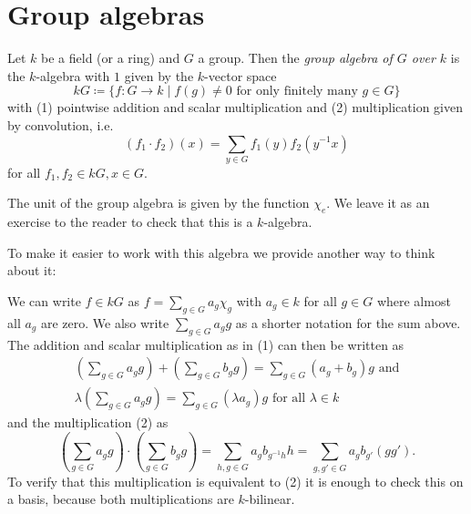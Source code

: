 \section{Group algebras}


\begin{defi}
  Let $k$ be a field (or a ring) and $G$ a group.
  Then the \emph{group algebra of $G$ over $k$} is the $k$-algebra with $1$ given by the $k$-vector space
  \[
              kG
    \coloneqq \{
                f \colon G \to k
              \mid
                f(g) \neq 0 \text{ for only finitely many } g \in G
              \}
  \]
  with (1) pointwise addition and scalar multiplication and (2) multiplication given by convolution, i.e.\
  \[
      (f_1 \cdot f_2)(x)
    = \sum_{y \in G} f_1(y) f_2\left( y^{-1}x \right)
  \]
  for all $f_1, f_2 \in kG, x \in G$.
\end{defi}

The unit of the group algebra is given by the function $\chi_e$.
We leave it as an exercise to the reader to check that this is a $k$-algebra.

To make it easier to work with this algebra we provide another way to think about it:

We can write $f \in kG$ as $f = \sum_{g \in G} a_g \chi_g$ with $a_g \in k$ for all $g \in G$ where almost all $a_g$ are zero.
We also write $\sum_{g \in G} a_g g$ as a shorter notation for the sum above.
The addition and scalar multiplication as in (1) can then be written as
\begin{gather*}
      \left( \sum_{g \in G} a_g g \right)
    + \left( \sum_{g \in G} b_g g \right)
  = \sum_{g \in G} (a_g + b_g) g
  \text{ and}
  \\
    \lambda \left( \sum_{g \in G} a_g g \right)
  = \sum_{g \in G} (\lambda a_g) g
    \text{ for all }
    \lambda \in k
\end{gather*}
and the multiplication (2) as
\[
          \left( \sum_{g \in G} a_g g \right)
    \cdot \left( \sum_{g \in G} b_g g \right)
  = \sum_{h, g \in G} a_g b_{g^{-1}h} h
  = \sum_{g, g' \in G} a_g b_{g'} (g g').
\]
To verify that this multiplication is equivalent to (2) it is enough to check this on a basis, because both multiplications are $k$-bilinear.

